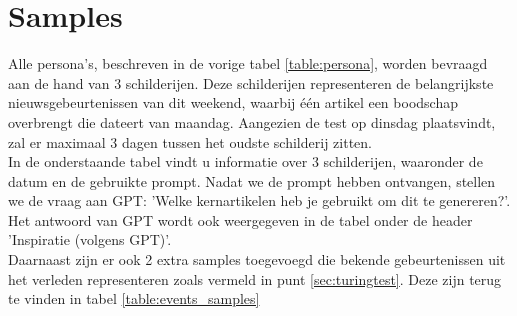 \section{Samples}
Alle persona's, beschreven in de vorige tabel \ref{table:persona}, worden bevraagd aan de hand van 3 schilderijen. Deze schilderijen representeren de belangrijkste nieuwsgebeurtenissen van dit weekend, waarbij één artikel een boodschap overbrengt die dateert van maandag. Aangezien de test op dinsdag plaatsvindt, zal er maximaal 3 dagen tussen het oudste schilderij zitten. \\

In de onderstaande tabel vindt u informatie over 3 schilderijen, waaronder de datum en de gebruikte prompt. Nadat we de prompt hebben ontvangen, stellen we de vraag aan GPT: 'Welke kernartikelen heb je gebruikt om dit te genereren?'. Het antwoord van GPT wordt ook weergegeven in de tabel onder de header 'Inspiratie (volgens GPT)'. \\

Daarnaast zijn er ook 2 extra samples toegevoegd die bekende gebeurtenissen uit het verleden representeren zoals vermeld in punt \ref{sec:turingtest}. Deze zijn terug te vinden in tabel \ref{table:events_samples}

